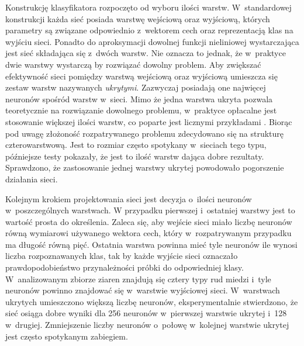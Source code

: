 Konstrukcję klasyfikatora rozpoczęto od wyboru ilości warstw.
W~standardowej konstrukcji każda sieć posiada warstwę wejściową oraz
wyjściową, których parametry są związane odpowiednio z~wektorem cech
oraz reprezentacją klas na wyjściu sieci.
Ponadto do aproksymacji dowolnej funkcji nieliniowej wystarczająca jest sieć
składająca się z~dwóch warstw.
Nie oznacza to jednak, że w~praktyce dwie warstwy wystarczą by rozwiązać
dowolny problem.
Aby zwiększać efektywność sieci pomiędzy warstwą wejściową oraz wyjściową
umieszcza się zestaw warstw nazywanych \emph{ukrytymi}.
Zazwyczaj posiadają one najwięcej neuronów spośród warstw w~sieci.
Mimo że jedna warstwa ukryta pozwala teoretycznie na rozwiązanie dowolnego
problemu, w~praktyce opłacalne jest stosowanie większej ilości warstw,
co poparte jest licznymi przykładami \cite{reed}.
Biorąc pod uwagę złożoność rozpatrywanego problemu zdecydowano się na
strukturę czterowarstwową.
Jest to rozmiar często spotykany w~sieciach tego typu, późniejsze testy
pokazały, że jest to ilość warstw dająca dobre rezultaty.
Sprawdzono, że zastosowanie jednej warstwy ukrytej powodowało pogorszenie
działania sieci.

Kolejnym krokiem projektowania sieci jest decyzja o~ilości neuronów
w~poszczególnych warstwach.
W przypadku pierwszej i~ostatniej warstwy jest to wartość prosta do
określenia.
Zaleca się, aby wejście sieci miało liczbę neuronów równą wymiarowi
używanego wektora cech, który w~rozpatrywanym przypadku ma długość równą pięć.
Ostatnia warstwa powinna mieć tyle neuronów ile wynosi liczba rozpoznawanych
klas, tak by każde wyjście sieci oznaczało prawdopodobieństwo przynależności
próbki do odpowiedniej klasy.
W~analizowanym zbiorze ziaren znajdują się cztery typy rud miedzi i~tyle
neuronów powinno znajdować się w~warstwie wyjściowej sieci.
W~warstwach ukrytych umieszczono większą liczbę neuronów, eksperymentalnie
stwierdzono, że sieć osiąga dobre wyniki dla 256 neuronów w~pierwszej
warstwie ukrytej i~128 w~drugiej.
Zmniejszenie liczby neuronów o~połowę w~kolejnej warstwie ukrytej jest
często spotykanym zabiegiem.


